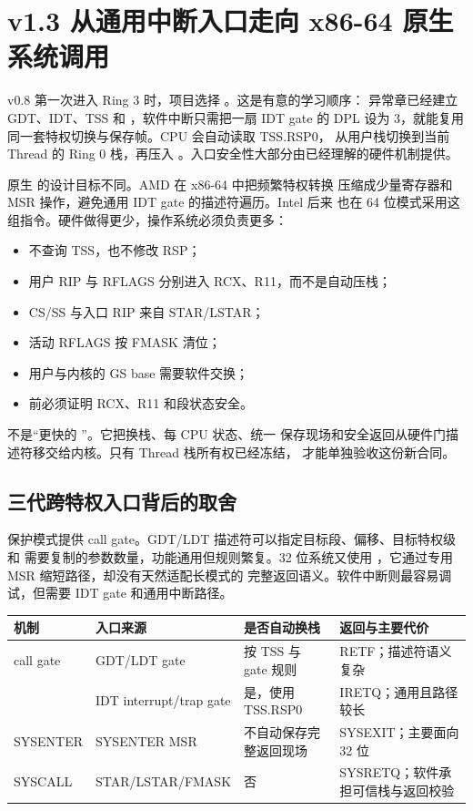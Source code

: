 \section{v1.3 从通用中断入口走向 x86-64 原生系统调用}

v0.8 第一次进入 Ring 3 时，项目选择 。这是有意的学习顺序：
异常章已经建立 GDT、IDT、TSS 和 ，软件中断只需把一扇 IDT gate
的 DPL 设为 3，就能复用同一套特权切换与保存帧。CPU 会自动读取 TSS.RSP0，
从用户栈切换到当前 Thread 的 Ring 0 栈，再压入
。入口安全性大部分由已经理解的硬件机制提供。

原生  的设计目标不同。AMD 在 x86-64 中把频繁特权转换
压缩成少量寄存器和 MSR 操作，避免通用 IDT gate 的描述符遍历。Intel 后来
也在 64 位模式采用这组指令。硬件做得更少，操作系统必须负责更多：

\begin{itemize}
  \item {} 不查询 TSS，也不修改 RSP；
  \item 用户 RIP 与 RFLAGS 分别进入 RCX、R11，而不是自动压栈；
  \item CS/SS 与入口 RIP 来自 STAR/LSTAR；
  \item 活动 RFLAGS 按 FMASK 清位；
  \item 用户与内核的 GS base 需要软件交换；
  \item {} 前必须证明 RCX、R11 和段状态安全。
\end{itemize}

\begin{keyidea}
 不是“更快的 ”。它把换栈、每 CPU 状态、统一
保存现场和安全返回从硬件门描述符移交给内核。只有 Thread 栈所有权已经冻结，
才能单独验收这份新合同。
\end{keyidea}

\subsection{三代跨特权入口背后的取舍}

保护模式提供 call gate。GDT/LDT 描述符可以指定目标段、偏移、目标特权级和
需要复制的参数数量，功能通用但规则繁复。32 位系统又使用
，它通过专用 MSR 缩短路径，却没有天然适配长模式的
完整返回语义。软件中断则最容易调试，但需要 IDT gate 和通用中断路径。

\begin{longtable}{L{0.18\textwidth}L{0.23\textwidth}L{0.24\textwidth}L{0.25\textwidth}}
\toprule
机制 & 入口来源 & 是否自动换栈 & 返回与主要代价\\
\midrule
call gate & GDT/LDT gate & 按 TSS 与 gate 规则 & RETF；描述符语义复杂\\
 & IDT interrupt/trap gate & 是，使用 TSS.RSP0 & IRETQ；通用且路径较长\\
SYSENTER & SYSENTER MSR & 不自动保存完整返回现场 & SYSEXIT；主要面向 32 位\\
SYSCALL & STAR/LSTAR/FMASK & 否 & SYSRETQ；软件承担可信栈与返回校验\\
\bottomrule
\end{longtable}

